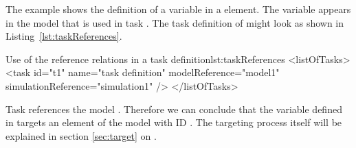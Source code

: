 The example shows the definition of a variable  in a  element. The variable appears in the model that is used in task . The task definition of  might look as shown in Listing~\ref{lst:taskReferences}.

\begin{myXmlLst}{Use of the reference relations in a task definition}{lst:taskReferences}
<listOfTasks>
	<task id="t1" name="task definition" modelReference="model1" simulationReference="simulation1" />
</listOfTasks>
\end{myXmlLst}
Task  references the model . Therefore we can conclude that the variable  defined in  targets an element of the model with ID . The targeting process itself will be explained in section \ref{sec:target} on .


